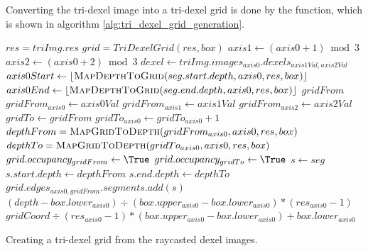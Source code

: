 Converting the tri-dexel image into a tri-dexel grid is done by the  function, which is shown in algorithm \ref{alg:tri_dexel_grid_generation}.
%
\begin{algorithm}
	\centering
	\begin{algorithmic}[1]
			\State $res = triImg.res$
			\State $grid = TriDexelGrid(res, box)$
				\State $axis1 \gets (axis0 + 1) \bmod 3$
				\State $axis2 \gets (axis0 + 2) \bmod 3$
						\State $dexel \gets triImg.images_{axis0}.dexels_{axis1Val, axis2Val}$
							\State $axis0Start \gets \floor{\Call{MapDepthToGrid}{seg.start.depth, axis0, res, box}}$
							\State $axis0End \gets \floor{\Call{MapDepthToGrid}{seg.end.depth, axis0, res, box}}$
								\State $gridFrom$
								\State $gridFrom_{axis0} \gets axis0Val$
								\State $gridFrom_{axis1} \gets axis1Val$
								\State $gridFrom_{axis2} \gets axis2Val$
								\State $gridTo \gets gridFrom$
								\State $gridTo_{axis0} \gets gridTo_{axis0} + 1$
								\State $depthFrom = \Call{MapGridToDepth}{gridFrom_{axis0}, axis0, res, box}$
								\State $depthTo = \Call{MapGridToDepth}{gridTo_{axis0}, axis0, res, box}$
									\State $grid.occupancy_{gridFrom} \gets \True$
								\EndIf
									\State $grid.occupancy_{gridTo} \gets \True$
								\EndIf
								\State $s \gets seg$
									\State $s.start.depth \gets depthFrom$
								\EndIf
									\State $s.end.depth \gets depthTo$
								\EndIf
								\State $grid.edges_{axis0, gridFrom}.segments.add(s)$
							\EndFor
						\EndFor
					\EndFor
				\EndFor
			\EndFor
		\EndFunction
			\State \Return $(depth - box.lower_{axis0}) \div (box.upper_{axis0} - box.lower_{axis0}) * (res_{axis0} - 1)$
		\EndFunction
			\State \Return $gridCoord \div (res_{axis0} - 1) * (box.upper_{axis0} - box.lower_{axis0}) + box.lower_{axis0}$
		\EndFunction
	\end{algorithmic}
	\caption{
		Creating a tri-dexel grid from the raycasted dexel images.
	}
	\label{alg:tri_dexel_grid_generation}
\end{algorithm}
%



